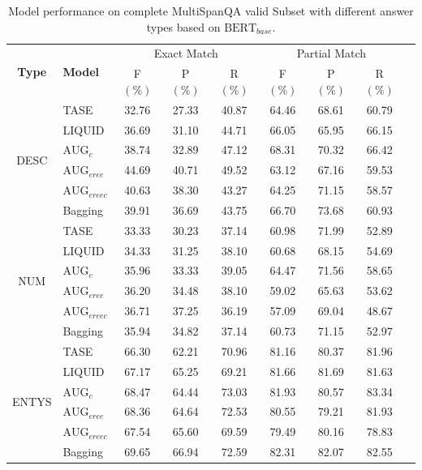 \documentclass[a4paper,fleqn]{cas-dc}
\newcommand{\1}[1]{\mathds{1}\left[#1\right]}
\begin{document}
	\begin{table}[ht]
		\caption{Model performance on complete MultiSpanQA valid Subset with different answer types based on $\text{BERT}_{base}$.}
		\label{tab:bertsub}
		\begin{tabular*}{\textwidth}{cp{1.5cm}ccccccc}
			\toprule
			\multirow{2}{*}{\textbf{Type}} & \multirow{2}{*}{\textbf{Model}} & \multicolumn{3}{c}{Exact Match} & \multicolumn{3}{c}{Partial Match} \\
			\cmidrule{3-8} 
			& & F\((\%)\) & P\((\%)\) & R\((\%)\) & F\((\%)\) & P\((\%)\) & R\((\%)\) \\
			\midrule
			\multirow{6}{*}{DESC} & TASE & 32.76 & 27.33 & 40.87 & 64.46 & 68.61 & 60.79 \\ 
			& LIQUID & 36.69 & 31.10 & 44.71 & 66.05 & 65.95 & 66.15 \\
			& $\text{AUG}_{c}$ & 38.74 & 32.89 & 47.12 & 68.31 & 70.32 & 66.42 \\
			& $\text{AUG}_{eree}$ & 44.69 & 40.71 & 49.52 & 63.12 & 67.16 & 59.53 \\
			& $\text{AUG}_{ereec}$ & 40.63 & 38.30 & 43.27 & 64.25 & 71.15 & 58.57 \\
			& Bagging & 39.91 & 36.69 & 43.75 & 66.70 & 73.68 & 60.93 \\
			\midrule
			\multirow{6}{*}{NUM} & TASE & 33.33 & 30.23 & 37.14 & 60.98 & 71.99 & 52.89 \\ 
			& LIQUID & 34.33 & 31.25 & 38.10 & 60.68 & 68.15 & 54.69 \\
			& $\text{AUG}_{c}$ & 35.96 & 33.33 & 39.05 & 64.47 & 71.56 & 58.65 \\
			& $\text{AUG}_{eree}$ & 36.20 & 34.48 & 38.10 & 59.02 & 65.63 & 53.62 \\
			& $\text{AUG}_{ereec}$ & 36.71 & 37.25 & 36.19 & 57.09 & 69.04 & 48.67 \\
			& Bagging & 35.94 & 34.82 & 37.14 & 60.73 & 71.15 & 52.97 \\
			\midrule
			\multirow{6}{*}{ENTYS} & TASE & 66.30 & 62.21 & 70.96 & 81.16 & 80.37 & 81.96 \\ 
			& LIQUID & 67.17 & 65.25 & 69.21 & 81.66 & 81.69 & 81.63 \\
			& $\text{AUG}_{c}$ & 68.47 & 64.44 & 73.03 & 81.93 & 80.57 & 83.34 \\
			& $\text{AUG}_{eree}$ & 68.36 & 64.64 & 72.53 & 80.55 & 79.21 & 81.93 \\
			& $\text{AUG}_{ereec}$ & 67.54 & 65.60 & 69.59 & 79.49 & 80.16 & 78.83 \\
			& Bagging & 69.65 & 66.94 & 72.59 & 82.31 & 82.07 & 82.55 \\
			\bottomrule
		\end{tabular*}
	\end{table}
	
\end{document}
